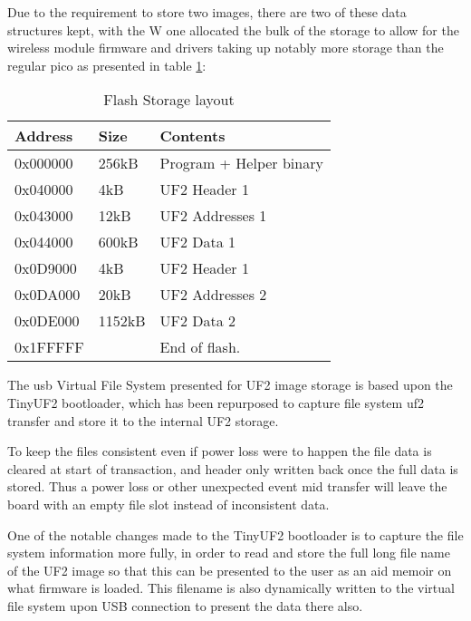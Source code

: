 Due to the requirement to store two images, there are two of these data structures kept, with the W one allocated the bulk of the storage to allow for the wireless module firmware and drivers taking up notably more storage than the regular pico as presented in table \ref{table:file_storage}:

\begin{table}[h]
	\centering
	\caption{Flash Storage layout}%
	\vspace{-16.5pt}%

		\begin{tabular}{|l|l|l|}
			\hline
			Address & Size  & Contents        \\ \hline
			0x000000 & 256kB & Program + Helper binary \\ \hline
			0x040000 & 4kB & UF2 Header 1      \\ \hline
			0x043000 & 12kB & UF2 Addresses 1 \\ \hline
			0x044000 & 600kB & UF2 Data 1 \\ \hline
			0x0D9000 & 4kB & UF2 Header 1 \\ \hline
			0x0DA000 & 20kB & UF2 Addresses 2      \\ \hline
			0x0DE000 & 1152kB & UF2 Data 2 \\ \hline
			0x1FFFFF & & End of flash. \\ \hline
		\end{tabular}
		\label{table:file_storage}
\end{table}

The \gls{usb} Virtual File System presented for UF2 image storage is based upon the TinyUF2 bootloader\cite{TinyUF2Bootloader2023}, which has been repurposed to capture file system uf2 transfer and store it to the internal UF2 storage.

To keep the files consistent even if power loss were to happen the file data is cleared at start of transaction, and header only written back once the full data is stored. Thus a power loss or other unexpected event mid transfer will leave the board with an empty file slot instead of inconsistent data.

One of the notable changes made to the TinyUF2 bootloader is to capture the file system information more fully, in order to read and store the full long file name of the UF2 image so that this can be presented to the user as an aid memoir on what firmware is loaded. This filename is also dynamically written to the virtual file system upon USB connection to present the data there also.

